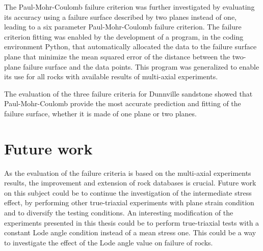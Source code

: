 The Paul-Mohr-Coulomb failure criterion was further investigated by evaluating its accuracy using a failure surface described by two planes instead of one, leading to a six parameter Paul-Mohr-Coulomb failure criterion. The failure criterion fitting was enabled by the development of a program, in the coding environment Python, that automatically allocated the data to the failure surface plane that minimize the mean squared error of the distance between the two-plane failure surface and the data points. This program was generalized to enable its use for all rocks with available results of multi-axial experiments. 

The evaluation of the three failure criteria for Dunnville sandstone showed that Paul-Mohr-Coulomb provide the most accurate prediction and fitting of the failure surface, whether it is made of one plane or two planes.

\section{Future work}

As the evaluation of the failure criteria is based on the multi-axial experiments results, the improvement and extension of rock databases is crucial. Future work on this subject could be to continue the investigation of the intermediate stress effect, by performing other true-triaxial experiments with plane strain condition and to diversify the testing conditions. An interesting modification of the experiments presented in this thesis could be to perform true-triaxial tests with a constant Lode angle condition instead of a mean stress one. This could be a way to investigate the effect of the Lode angle value on failure of rocks. 